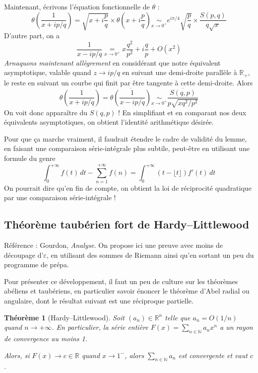 \documentclass[a4paper, 11pt]{article}
\def\N{\mathbb{N}}
\def\R{\mathbb{R}}
\newtheorem*{theorem}{Théorème}
\begin{document}
Maintenant, écrivons l'équation fonctionnelle de $\theta$ :
  \[ \theta\left( \frac{1}{x + ip/q} \right) =
    \sqrt{x + i\frac{p}{q}} \times \theta\left( x + i\frac{p}{q} \right)
    \underset{x \to 0^+}{\sim} e^{i\pi/4} \sqrt{\frac{p}{q}}
    \times \frac{S(p,q)}{q\sqrt{x}}
  \]
D'autre part, on a
  \[ \frac{1}{x - ip/q} \underset{x \to 0^+}{=}
    x\frac{q^2}{p^2} + i \frac{q}{p} + O(x^2)  \]
\emph{Arnaquons maintenant allègrement} en considérant que notre équivalent
asymptotique, valable quand $z \to ip/q$ en suivant une demi-droite parallèle à
$\R_+$, le reste en suivant un courbe qui finit par être tangente à cette
demi-droite. Alors
\[ \theta\left( \frac{1}{x + ip/q} \right)
  = \overline{\theta\left( \frac{1}{x - ip/q} \right)}
    \underset{x \to 0^+}{\sim} \frac{\overline{S(q,p)}}{p\sqrt{xq^2/p^2}}
  \]
  On voit donc apparaître du $S(q,p)$ ! En simplifiant et en comparant nos deux
  équivalents asymptotiques, on obtient l'identité arithmétique désirée.

Pour que ça marche vraiment, il faudrait étendre le cadre de validité du lemme,
en faisant une comparaison série-intégrale plus subtile, peut-être en utilisant
une formule du genre
  \[ \int_0^{+\infty} f(t)\,dt - \sum_{n=1}^{+\infty} f(n) =
    \int_0^{+\infty} (t - \lfloor t \rfloor)f'(t)\,dt
  \]
  On pourrait dire qu'en fin de compte, on obtient la loi de réciprocité
  quadratique par une comparaison série-intégrale !


\newpage

\subsection{Théorème taubérien fort de Hardy--Littlewood}

Référence : Gourdon, \emph{Analyse}. On propose ici une preuve avec moins de
découpage d'$\varepsilon$, en utilisant des sommes de Riemann ainsi qu'en
sortant un peu du programme de prépa.

Pour présenter ce développement, il faut un peu de culture sur les théorèmes
abéliens et taubériens, en particulier savoir énoncer le théorème d'Abel radial
ou angulaire, dont le résultat suivant est une réciproque partielle.

\begin{theorem}[Hardy--Littlewood]
  Soit $(a_n) \in \R^n$ telle que $a_n = O(1/n)$ quand $n \to +\infty$. En
  particulier, la série entière $F(x) = \sum_{n \in \N} a_n x^n$ a un rayon de
  convergence au moins 1.

  Alors, si $F(x) \to c \in \R$ quand $x \to 1^-$, alors $\sum_{n \in \N} a_n$
  est convergente et vaut $c$.
\end{theorem}
\end{document}
